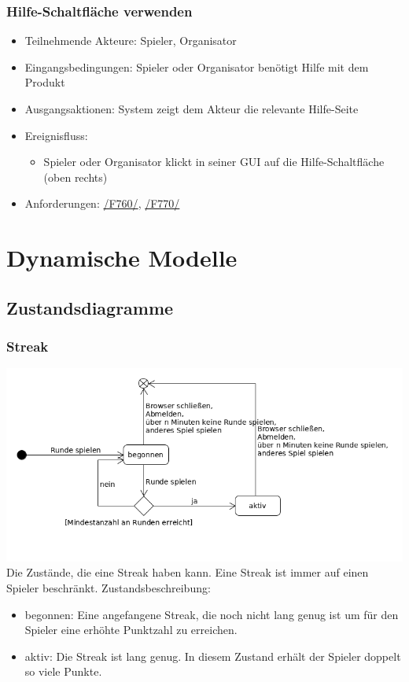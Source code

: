 \documentclass[a4paper]{scrreprt}
\begin{document}
    \subsection{Hilfe-Schaltfläche verwenden}
    \begin{itemize}
        \item Teilnehmende Akteure: \Gls{Spieler}, \Gls{Organisator}
        \item Eingangsbedingungen: \Gls{Spieler} oder \Gls{Organisator} benötigt Hilfe mit dem Produkt
        \item Ausgangsaktionen: System zeigt dem Akteur die relevante Hilfe-Seite
        \item Ereignisfluss:
            \begin{itemize}
                \item \Gls{Spieler} oder \Gls{Organisator} klickt in seiner GUI auf die Hilfe-Schaltfläche (oben rechts)
            \end{itemize}
        \item Anforderungen: \hyperlink{F760}{/F760/}, \hyperlink{F770}{/F770/}
    \end{itemize}


    \chapter{Dynamische Modelle}
    \section{Zustandsdiagramme}
    \subsection{Streak}
    \label{fig:Streak_State}
    \includegraphics[width=\textwidth]{uml/export/Streak_Zustand.png}
    Die Zustände, die eine Streak haben kann.
    Eine Streak ist immer auf einen \Gls{Spieler} beschränkt.
    Zustandsbeschreibung:
    \begin{itemize}
    \item begonnen: Eine angefangene Streak, die noch nicht lang genug ist um für den \Gls{Spieler} eine erhöhte Punktzahl zu erreichen.
    \item aktiv: Die Streak ist lang genug. In diesem Zustand erhält der \Gls{Spieler} doppelt so viele Punkte.
    \end{itemize}
\end{document}
